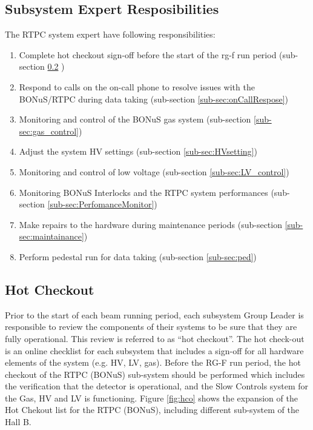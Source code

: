 
\subsection{Subsystem Expert Resposibilities}
The RTPC system expert have following responsibilities:

\begin{enumerate}
	\item Complete hot checkout sign-off before the start of the rg-f run period (sub-section \ref{sub-sec:hotcheckout} )
	\item Respond to calls on the on-call phone to resolve issues with the BONuS/RTPC during data taking (sub-section \ref{sub-sec:onCallRespose})
	\item Monitoring and control of the BONuS gas system (sub-section \ref{sub-sec:gas_control})
	\item Adjust the system HV settings (sub-section \ref{sub-sec:HVsetting})
	\item Monitoring and control of low voltage (sub-section \ref{sub-sec:LV_control})
	\item Monitoring BONuS Interlocks and the RTPC system performances (sub-section \ref{sub-sec:PerfomanceMonitor})
	\item Make repairs to the hardware during maintenance periods (sub-section \ref{sub-sec:maintainance})
	\item Perform pedestal run for data taking (sub-section \ref{sub-sec:ped})
\end{enumerate}


\subsection{Hot Checkout}
\label{sub-sec:hotcheckout}

Prior to the start of each beam running period, each subsystem Group Leader is responsible to review the components of their systems to be sure that they are fully operational. This review is referred to as “hot checkout”. The hot check-out is an online checklist for each subsystem that includes a sign-off for all hardware elements of the system (e.g. HV, LV, gas). Before the RG-F run period, the hot checkout of the RTPC (BONuS) sub-system should be performed which includes the verification that the detector is operational, and the Slow Controls system for the Gas, HV and LV is functioning. Figure \ref{fig:hco} shows the expansion of the Hot Chekout list for the RTPC (BONuS), including different sub-system of the Hall B.

